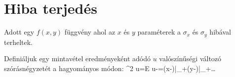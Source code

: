 \chapter{Hiba terjedés}

Adott egy $f(x,y)$ függvény ahol az $x$ és $y$ paraméterek a $\sigma_x$ és $\sigma_y$ hibával terheltek. 

Definiáljuk egy mintavétel eredményeként adódó $u$ valószínűségi változó szórásnégyzetét a hagyományos módon:
\beq
\label{equ:error-szoras}
\sigma^2 u=E 
\eeq
\beq
u-=(x-)\bigg|_{}+(y-)\bigg|_{}+\dots
\eeq
